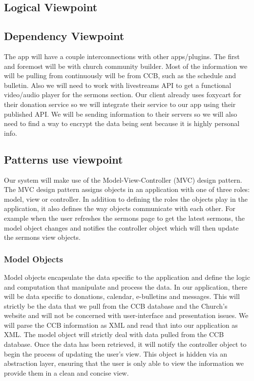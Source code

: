 \documentclass[letterpaper,10pt,draftclsnofoot,onecolumn,titlepage]{IEEEtran}
\begin{document}
		\subsection{Logical Viewpoint}

		\subsection{Dependency Viewpoint}
			The app will have a couple interconnections with other apps/plugins.
			The first and foremost will be with church community builder.
			Most of the information we will be pulling from continuously will be from CCB, such as the schedule and bulletin.
			Also we will need to work with livestreams API to get a functional video/audio player for the sermons section.
			Our client already uses foxycart for their donation service so we will integrate their service to our app using their published API.
			We will be sending information to their servers so we will also need to find a way to encrypt the data being sent because it is highly personal info.

		\subsection{Patterns use viewpoint}
			Our system will make use of the Model-View-Controller (MVC) design pattern.
			The MVC design pattern assigns objects in an application with one of three roles: model, view or controller.
			In addition to defining the roles the objects play in the application, it also defines the way objects communicate with each other.
			For example when the user refreshes the sermons page to get the latest sermons, the model object changes and notifies the controller object which will then update the sermons view objects.

			\subsubsection{Model Objects}
				Model objects encapsulate the data specific to the application and define the logic and computation that manipulate and process the data.
				In our application, there will be data specific to donations, calendar, e-bulletins and messages.
				This will strictly be the data that we pull from the CCB database and the Church's website and will not be concerned with user-interface and presentation issues.
				We will parse the CCB information as XML and read that into our application as XML.
				The model object will strictly deal with data pulled from the CCB database.
				Once the data has been retrieved, it will notify the controller object to begin the process of updating the user's view.
				This object is hidden via an abstraction layer, ensuring that the user is only able to view the information we provide them in a clean and concise view.
\end{document}
